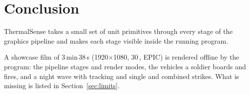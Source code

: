 \section{Conclusion}
\label{sec:conclusion}
ThermalSense takes a small set of unit primitives through every stage of the graphics pipeline and makes each stage
visible inside the running program.



A showcase film of 3\,min\,38\,s (1920$\times$1080, 30\,, EPIC) is rendered offline by the program: the pipeline
stages and render modes, the vehicles a soldier boards and fires, and a night wave with  tracking and single and combined strikes. What is missing is listed in
Section~\ref{sec:limits}.
